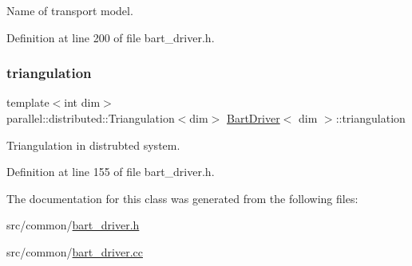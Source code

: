 Name of transport model. 



Definition at line 200 of file bart\+\_\+driver.\+h.

\mbox{\label{class_bart_driver_a8bdcafa21b042017d1e871ed07ae3a81}} 
\subsubsection{\texorpdfstring{triangulation}{triangulation}}
{\footnotesize\ttfamily template$<$int dim$>$ \\
parallel\+::distributed\+::\+Triangulation$<$dim$>$ \hyperlink{class_bart_driver}{Bart\+Driver}$<$ dim $>$\+::triangulation\hspace{0.3cm}{\ttfamily [private]}}



Triangulation in distrubted system. 



Definition at line 155 of file bart\+\_\+driver.\+h.



The documentation for this class was generated from the following files\+:\begin{DoxyCompactItemize}
\item 
src/common/\hyperlink{bart__driver_8h}{bart\+\_\+driver.\+h}\item 
src/common/\hyperlink{bart__driver_8cc}{bart\+\_\+driver.\+cc}\end{DoxyCompactItemize}
